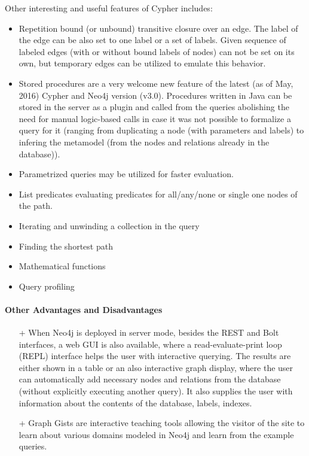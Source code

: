 Other interesting and useful features of Cypher includes:
\begin{itemize}[topsep=0pt]
  \item Repetition bound (or unbound) transitive closure over an edge. The label of the edge can be also set to one label or a set of labels. Given sequence of labeled edges (with or without bound labels of nodes) can not be set on its own, but temporary edges can be utilized to emulate this behavior.
  \item Stored procedures are a very welcome new feature of the latest (as of May, 2016) Cypher and Neo4j version (v3.0). Procedures written in Java can be stored in the server as a plugin and called from the queries abolishing the need for manual logic-based calls in case it was not possible to formalize a query for it (ranging from duplicating a node (with parameters and labels) to infering the metamodel (from the nodes and relations already in the database)).
  \item Parametrized queries may be utilized for faster evaluation.
  \item List predicates evaluating predicates for all/any/none or single one nodes of the path.
  \item Iterating and unwinding a collection in the query
  \item Finding the shortest path
  \item Mathematical functions
  \item Query profiling
\end{itemize}


\paragraph{Other Advantages and Disadvantages}
\begin{itemize}[topsep=0pt]
  \item[+] When Neo4j is deployed in server mode, besides the REST and Bolt interfaces, a web GUI is also available, where a read-evaluate-print loop (REPL) interface helps the user with interactive querying. The results are either shown in a table or an also interactive graph display, where the user can automatically add necessary nodes and relations from the database (without explicitly executing another query). It also supplies the user with information about the contents of the database, labels, indexes.
  \item[+] Graph Gists are interactive teaching tools allowing the visitor of the site to learn about various domains modeled in Neo4j and learn from the example queries.
\end{itemize}

